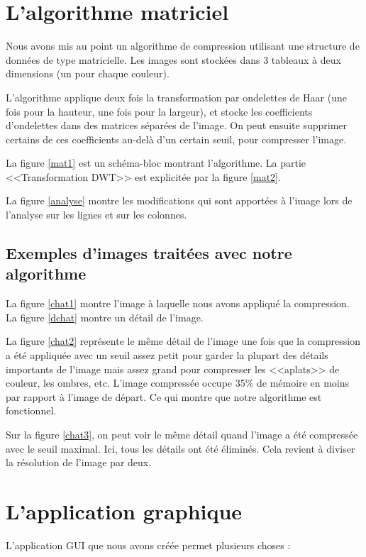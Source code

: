 \documentclass{article}
\begin{document}
\section{L'algorithme matriciel}

Nous avons mis au point un algorithme de compression utilisant une structure de données de type matricielle. Les images sont stockées dans 3 tableaux à deux dimensions (un pour chaque couleur).

L'algorithme applique deux fois la transformation par ondelettes de Haar (une fois pour la hauteur, une fois pour la largeur), et stocke les coefficients d'ondelettes dans des matrices séparées de l'image. On peut ensuite supprimer certains de ces coefficients au-delà d'un certain seuil, pour compresser l'image.

La figure \ref{mat1} est un schéma-bloc montrant l'algorithme. La partie <<Transformation DWT>> est explicitée par la figure \ref{mat2}.

La figure \ref{analyse} montre les modifications qui sont apportées à l'image lors de l'analyse sur les lignes et sur les colonnes.

\subsection{Exemples d'images traitées avec notre algorithme}


La figure \ref{chat1} montre l'image à laquelle nous avons appliqué la compression. La figure \ref{dchat} montre un détail de l'image.


La figure \ref{chat2} représente le même détail de l'image une fois que la compression a été appliquée avec un seuil assez petit pour garder la plupart des détails importants de l'image mais assez grand pour compresser les <<aplats>> de couleur, les ombres, etc. L'image compressée occupe 35\% de mémoire en moins par rapport à l'image de départ. Ce qui montre que notre algorithme est fonctionnel.


Sur la figure \ref{chat3}, on peut voir le même détail quand l'image a été compressée avec le seuil maximal. Ici, tous les détails ont été éliminés. Cela revient à diviser la résolution de l'image par deux.



\section{L'application graphique}

L'application GUI que nous avons créée permet plusieurs choses :
\end{document}
